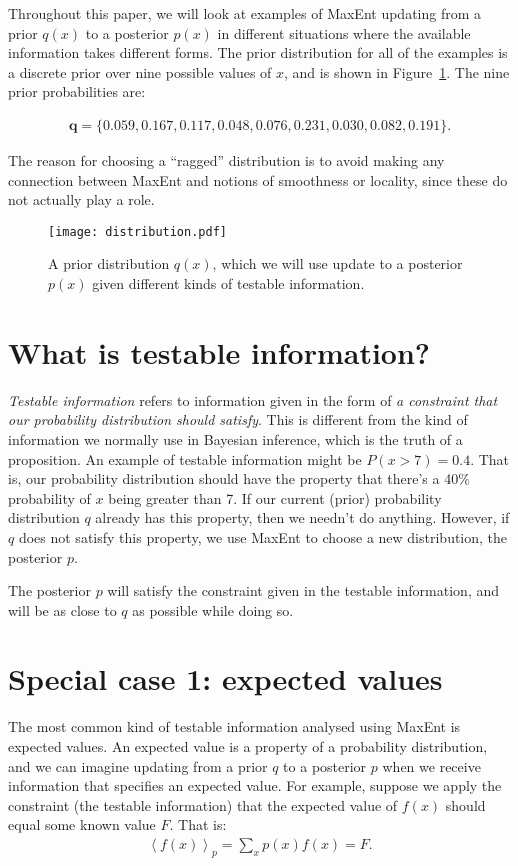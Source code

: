 \documentclass[a4paper, 11pt]{article}
\begin{document}
Throughout this paper, we will look at examples of MaxEnt updating from a prior
$q(x)$ to a posterior $p(x)$ in different situations where the available
information takes different forms. The prior distribution for all of the
examples is a discrete prior over nine possible values of $x$, and is shown
in Figure~\ref{fig:distribution}. The nine prior probabilities are:

\begin{eqnarray}
\boldsymbol{q} = \{0.059, 0.167, 0.117, 0.048, 0.076, 0.231, 0.030, 0.082, 0.191\}.
\end{eqnarray}

The reason for choosing a ``ragged'' distribution is to avoid making any
connection between MaxEnt and notions of smoothness or locality, since these
do not actually play a role.

\begin{figure}
\begin{center}
\texttt{[image: distribution.pdf]}
\caption{A prior distribution $q(x)$, which we will use
update to a posterior $p(x)$ given different kinds of testable information.
\label{fig:distribution}}
\end{center}
\end{figure}

\section{What is testable information?}
{\it Testable information} refers to information given in the form of
{\it a constraint that our probability distribution should satisfy}. This is
different from the kind of information we normally use in Bayesian inference,
which is the truth of a proposition. An example of testable information
might be $P(x > 7) = 0.4$. That is, our probability distribution should have
the property that there's a 40\% probability of $x$ being greater than 7.
If our current (prior) probability distribution $q$ already has this property,
then we needn't do anything. However, if $q$ does not satisfy this property,
we use MaxEnt to choose a new distribution, the posterior $p$.

The posterior $p$ will satisfy the constraint given in the testable information,
and will be as close to $q$ as possible while doing so.



\section{Special case 1: expected values}\label{sec:expectations}
The most common kind of testable information analysed using MaxEnt is
expected values. An expected value is a property of a probability distribution,
and we can imagine updating from a prior $q$ to a posterior
$p$ when we receive information that specifies an expected value.
For example, suppose we apply the constraint (the testable information)
that the expected value of $f(x)$ should equal some known value $F$. That is:
\begin{eqnarray}
\left<f(x)\right>_p = \sum_x p(x)f(x) = F.\label{eq:expected_value}
\end{eqnarray}
\end{document}

